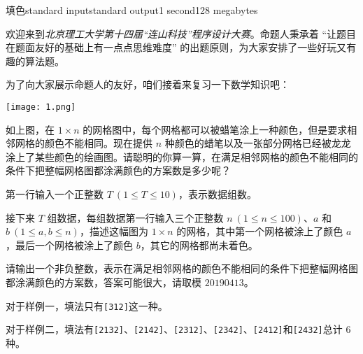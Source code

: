 \begin{problem}{填色}{standard input}{standard output}{1 second}{128 megabytes}

    欢迎来到\textit{北京理工大学第十四届“连山科技”程序设计大赛}。命题人秉承着 “让题目在题面友好的基础上有一点点思维难度” 的出题原则，为大家安排了一些好玩又有趣的算法题。
    
    为了向大家展示命题人的友好，咱们接着来复习一下数学知识吧：

    \begin{center}
        \texttt{[image: 1.png]}
    \end{center}

    如上图，在 $1\times n$ 的网格图中，每个网格都可以被蜡笔涂上一种颜色，但是要求相邻网格的颜色不能相同。现在提供 $n$ 种颜色的蜡笔以及一张部分网格已经被龙龙涂上了某些颜色的绘画图。请聪明的你算一算，在满足相邻网格的颜色不能相同的条件下把整幅网格图都涂满颜色的方案数是多少呢？


    \InputFile
    
    第一行输入一个正整数 $T\ (1\le T\le 10)$，表示数据组数。
    
    接下来 $T$ 组数据，每组数据第一行输入三个正整数 $n\ (1\le n\le 100)$、$a$ 和 $b\ (1\le a,b\le n)$，描述这幅图为 $1\times n$ 的网格，其中第一个网格被涂上了颜色 $a$，最后一个网格被涂上了颜色 $b$，其它的网格都尚未着色。
    
    \OutputFile
    
    请输出一个非负整数，表示在满足相邻网格的颜色不能相同的条件下把整幅网格图都涂满颜色的方案数，答案可能很大，请取模 $20190413$。
    
    \Example
    
    \begin{example}
    \end{example}

    \Explanation

    对于样例一，填法只有\texttt{[312]}这一种。
    
    对于样例二，填法有\texttt{[2132]}、\texttt{[2142]}、\texttt{[2312]}、\texttt{[2342]}、\texttt{[2412]}和\texttt{[2432]}总计 $6$ 种。

\end{problem}